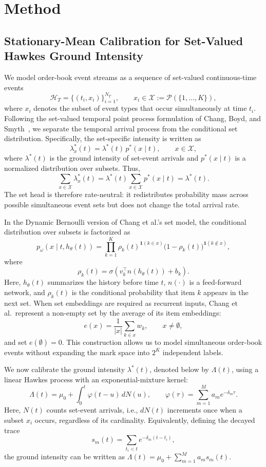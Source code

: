 \section{Method}
\label{sec:method}

\subsection{Stationary-Mean Calibration for Set-Valued Hawkes Ground Intensity}
\label{subsec:hawkes_mean_calibration}

We model order-book event streams as a sequence of set-valued continuous-time events
\[
\mathcal{H}_T=\{(t_i,x_i)\}_{i=1}^{N_T},
\qquad
x_i \in \mathcal{X}:=\mathcal{P}(\{1,\ldots,K\}),
\]
where $x_i$ denotes the subset of event types that occur simultaneously at time $t_i$.
Following the set-valued temporal point process formulation of Chang, Boyd, and
Smyth~\cite{chang2024probabilistic}, we separate the temporal arrival process from the
conditional set distribution. Specifically, the set-specific intensity is written as
\[
\lambda_x^*(t)=\lambda^*(t)\,p^*(x\mid t),
\qquad x\in\mathcal{X},
\]
where $\lambda^*(t)$ is the ground intensity of set-event arrivals and $p^*(x\mid t)$ is a
normalized distribution over subsets. Thus,
\[
\sum_{x\in\mathcal{X}}\lambda_x^*(t)
=\lambda^*(t)\sum_{x\in\mathcal{X}}p^*(x\mid t)
=\lambda^*(t).
\]
The set head is therefore rate-neutral: it redistributes probability mass across possible
simultaneous event sets but does not change the total arrival rate.

In the Dynamic Bernoulli version of Chang et al.'s set model, the conditional distribution
over subsets is factorized as
\[
p_\omega(x\mid t,h_\theta(t))
=\prod_{k=1}^{K}
\rho_k(t)^{\mathbf{1}(k\in x)}
\bigl(1-\rho_k(t)\bigr)^{\mathbf{1}(k\notin x)},
\]
where
\[
\rho_k(t)=\sigma\!\left(v_k^\top n(h_\theta(t))+b_k\right).
\]
Here, $h_\theta(t)$ summarizes the history before time $t$, $n(\cdot)$ is a feed-forward
network, and $\rho_k(t)$ is the conditional probability that item $k$ appears in the next
set. When set embeddings are required as recurrent inputs, Chang et al.\ represent a
non-empty set by the average of its item embeddings:
\[
e(x)=\frac{1}{|x|}\sum_{k\in x}w_k,
\qquad x\neq\emptyset,
\]
and set $e(\emptyset)=0$. This construction allows us to model simultaneous order-book
events without expanding the mark space into $2^K$ independent labels.

We now calibrate the ground intensity $\lambda^*(t)$, denoted below by $\Lambda(t)$, using a
linear Hawkes process with an exponential-mixture kernel:
\[
\Lambda(t)=\mu_0+\int_0^t \varphi(t-u)\,dN(u),
\qquad
\varphi(\tau)=\sum_{m=1}^{M}a_m e^{-\delta_m \tau}.
\]
Here, $N(t)$ counts set-event arrivals, i.e., $dN(t)$ increments once when a subset $x_i$
occurs, regardless of its cardinality. Equivalently, defining the decayed trace
\[
s_m(t)=\sum_{t_i<t} e^{-\delta_m(t-t_i)},
\]
the ground intensity can be written as $\Lambda(t)=\mu_0+\sum_{m=1}^{M}a_m s_m(t)$.

